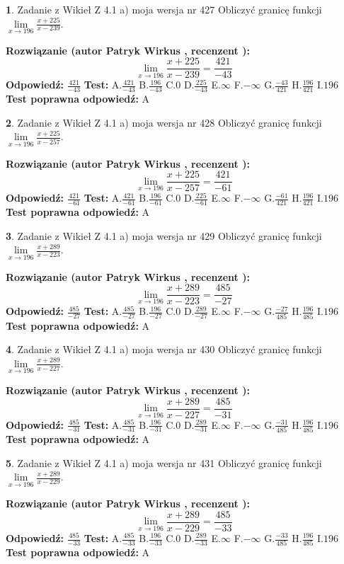 \documentclass[12pt, a4paper]{article}
\theoremstyle{definition} %
\newtheorem{zad}{}
\newcommand{\zadStart}[1]{\begin{zad}#1\newline}
\newcommand{\zadStop}{\end{zad}}
\newcommand{\rozwStart}[2]{\noindent \textbf{Rozwiązanie (autor #1 , recenzent #2): }\newline}
\newcommand{\rozwStop}{\newline}
\newcommand{\odpStart}{\noindent \textbf{Odpowiedź:}\newline}
\newcommand{\odpStop}{\newline}
\newcommand{\testStart}{\noindent \textbf{Test:}\newline}
\newcommand{\testStop}{\newline}
\newcommand{\kluczStart}{\noindent \textbf{Test poprawna odpowiedź:}\newline}
\newcommand{\kluczStop}{\newline}
\begin{document}
\zadStart{Zadanie z Wikieł Z 4.1 a) moja wersja nr 427}
Obliczyć granicę funkcji $\lim\limits_{x\to196}\frac{x+225}{x-239}$.
\zadStop
\rozwStart{Patryk Wirkus}{}
$$\lim\limits_{x\to196}\frac{x+225}{x-239} = \frac{421}{-43}$$
\rozwStop
\odpStart
$\frac{421}{-43}$
\odpStop
\testStart
A.$\frac{421}{-43}$
B.$\frac{196}{-43}$
C.$0$
D.$\frac{225}{-43}$
E.$\infty$
F.$-\infty$
G.$\frac{-43}{421}$
H.$\frac{196}{421}$
I.$196$
\testStop
\kluczStart
A
\kluczStop



\zadStart{Zadanie z Wikieł Z 4.1 a) moja wersja nr 428}
Obliczyć granicę funkcji $\lim\limits_{x\to196}\frac{x+225}{x-257}$.
\zadStop
\rozwStart{Patryk Wirkus}{}
$$\lim\limits_{x\to196}\frac{x+225}{x-257} = \frac{421}{-61}$$
\rozwStop
\odpStart
$\frac{421}{-61}$
\odpStop
\testStart
A.$\frac{421}{-61}$
B.$\frac{196}{-61}$
C.$0$
D.$\frac{225}{-61}$
E.$\infty$
F.$-\infty$
G.$\frac{-61}{421}$
H.$\frac{196}{421}$
I.$196$
\testStop
\kluczStart
A
\kluczStop



\zadStart{Zadanie z Wikieł Z 4.1 a) moja wersja nr 429}
Obliczyć granicę funkcji $\lim\limits_{x\to196}\frac{x+289}{x-223}$.
\zadStop
\rozwStart{Patryk Wirkus}{}
$$\lim\limits_{x\to196}\frac{x+289}{x-223} = \frac{485}{-27}$$
\rozwStop
\odpStart
$\frac{485}{-27}$
\odpStop
\testStart
A.$\frac{485}{-27}$
B.$\frac{196}{-27}$
C.$0$
D.$\frac{289}{-27}$
E.$\infty$
F.$-\infty$
G.$\frac{-27}{485}$
H.$\frac{196}{485}$
I.$196$
\testStop
\kluczStart
A
\kluczStop



\zadStart{Zadanie z Wikieł Z 4.1 a) moja wersja nr 430}
Obliczyć granicę funkcji $\lim\limits_{x\to196}\frac{x+289}{x-227}$.
\zadStop
\rozwStart{Patryk Wirkus}{}
$$\lim\limits_{x\to196}\frac{x+289}{x-227} = \frac{485}{-31}$$
\rozwStop
\odpStart
$\frac{485}{-31}$
\odpStop
\testStart
A.$\frac{485}{-31}$
B.$\frac{196}{-31}$
C.$0$
D.$\frac{289}{-31}$
E.$\infty$
F.$-\infty$
G.$\frac{-31}{485}$
H.$\frac{196}{485}$
I.$196$
\testStop
\kluczStart
A
\kluczStop



\zadStart{Zadanie z Wikieł Z 4.1 a) moja wersja nr 431}
Obliczyć granicę funkcji $\lim\limits_{x\to196}\frac{x+289}{x-229}$.
\zadStop
\rozwStart{Patryk Wirkus}{}
$$\lim\limits_{x\to196}\frac{x+289}{x-229} = \frac{485}{-33}$$
\rozwStop
\odpStart
$\frac{485}{-33}$
\odpStop
\testStart
A.$\frac{485}{-33}$
B.$\frac{196}{-33}$
C.$0$
D.$\frac{289}{-33}$
E.$\infty$
F.$-\infty$
G.$\frac{-33}{485}$
H.$\frac{196}{485}$
I.$196$
\testStop
\kluczStart
A
\kluczStop
\end{document}
